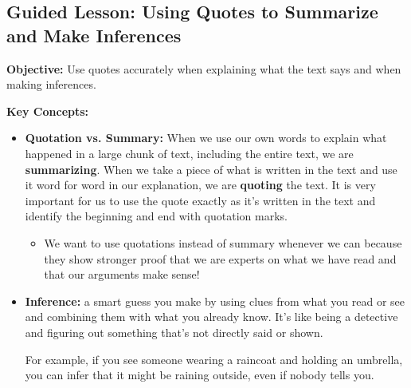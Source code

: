\documentclass[12pt]{article}
\title{}
\date{}
\begin{document}
\subsection*{Guided Lesson: Using Quotes to Summarize and Make Inferences}
\onehalfspacing

\begin{tcolorbox}[colframe=black!40, colback=gray!5, 
coltitle=black, colbacktitle=black!20, fonttitle=\bfseries\Large, 
title=Learning Objective, halign title=center, left=5pt, right=5pt, top=5pt, bottom=15pt]
\textbf{Objective:} Use quotes accurately when explaining what the text says and when making inferences.
\end{tcolorbox}

\vspace{1em}

\begin{tcolorbox}[colframe=black!60, colback=white, 
coltitle=black, colbacktitle=black!15, fonttitle=\bfseries\Large, 
title=Key Concepts and Vocabulary, halign title=center, left=10pt, right=10pt, top=10pt, bottom=15pt]
\textbf{Key Concepts:}
\begin{itemize}
    \item \textbf{Quotation vs. Summary:} When we use our own words to explain what happened in a large chunk of text, including the entire text, we are \textbf{summarizing}. When we take a piece of what is written in the text and use it word for word in our explanation, we are \textbf{quoting} the text. It is very important for us to use the quote exactly as it's written in the text and identify the beginning and end with quotation marks. 
    \begin{itemize}
        \item We want to use quotations instead of summary whenever we can because they show stronger proof that we are experts on what we have read and that our arguments make sense!
    \end{itemize}
    \item \textbf{Inference:} a smart guess you make by using clues from what you read or see and combining them with what you already know. It's like being a detective and figuring out something that's not directly said or shown.

For example, if you see someone wearing a raincoat and holding an umbrella, you can infer that it might be raining outside, even if nobody tells you.

 

    \end{itemize}


\end{tcolorbox}
\end{document}
